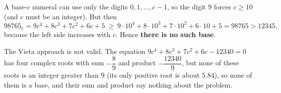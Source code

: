 A base-$c$ numeral can use only the digits $0,1,\dots,c-1$, so the digit $9$ forces $c\ge10$ (and $c$ must be an integer). But then
\[
98765_c=9c^4+8c^3+7c^2+6c+5\ \ge\ 9\cdot10^4+8\cdot10^3+7\cdot10^2+6\cdot10+5=98765>12345,
\]
because the left side increases with $c$. Hence \textbf{there is no such base}.

The Vieta approach is not valid. The equation $9c^4+8c^3+7c^2+6c-12340=0$ has four complex roots with sum $-\dfrac{8}{9}$ and product $-\dfrac{12340}{9}$, but none of these roots is an integer greater than $9$ (its only positive root is about $5.84$), so none of them is a base, and their sum and product say nothing about the problem.
